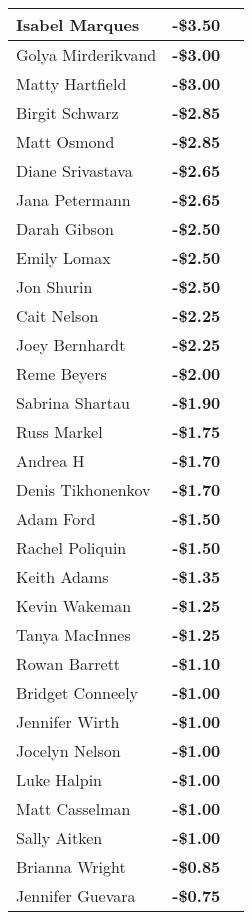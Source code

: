 \begin{longtable}{|l|r|c|}
Isabel Marques & \textbf{-\$3.50} & \\\hline
Golya Mirderikvand & \textbf{-\$3.00} & \\\hline
Matty Hartfield & \textbf{-\$3.00} & \\\hline
Birgit Schwarz & \textbf{-\$2.85} & \\\hline
Matt Osmond & \textbf{-\$2.85} & \\\hline
Diane Srivastava & \textbf{-\$2.65} & \\\hline
Jana Petermann & \textbf{-\$2.65} & \\\hline
Darah Gibson & \textbf{-\$2.50} & \\\hline
Emily Lomax & \textbf{-\$2.50} & \\\hline
Jon Shurin & \textbf{-\$2.50} & \\\hline
Cait Nelson & \textbf{-\$2.25} & \\\hline
Joey Bernhardt & \textbf{-\$2.25} & \\\hline
Reme Beyers & \textbf{-\$2.00} & \\\hline
Sabrina Shartau & \textbf{-\$1.90} & \\\hline
Russ Markel & \textbf{-\$1.75} & \\\hline
Andrea H & \textbf{-\$1.70} & \\\hline
Denis Tikhonenkov & \textbf{-\$1.70} & \\\hline
Adam Ford & \textbf{-\$1.50} & \\\hline
Rachel Poliquin & \textbf{-\$1.50} & \\\hline
Keith Adams & \textbf{-\$1.35} & \\\hline
Kevin Wakeman & \textbf{-\$1.25} & \\\hline
Tanya MacInnes & \textbf{-\$1.25} & \\\hline
Rowan Barrett & \textbf{-\$1.10} & \\\hline
Bridget Conneely & \textbf{-\$1.00} & \\\hline
Jennifer Wirth & \textbf{-\$1.00} & \\\hline
Jocelyn Nelson & \textbf{-\$1.00} & \\\hline
Luke Halpin & \textbf{-\$1.00} & \\\hline
Matt Casselman & \textbf{-\$1.00} & \\\hline
Sally Aitken & \textbf{-\$1.00} & \\\hline
Brianna Wright & \textbf{-\$0.85} & \\\hline
Jennifer Guevara & \textbf{-\$0.75} & \\\hline

\end{longtable}
